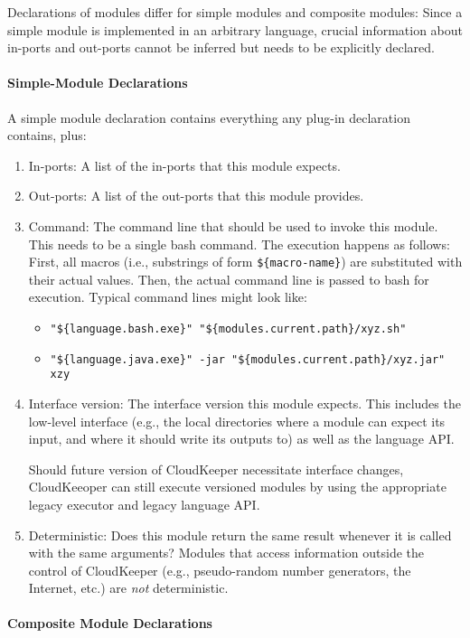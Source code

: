 Declarations of modules differ for simple modules and composite modules: Since a simple module is implemented in an arbitrary language, crucial information about in-ports and out-ports cannot be inferred but needs to be explicitly declared.

\paragraph{Simple-Module Declarations}

A simple module declaration contains everything any plug-in declaration contains, plus:
%
\begin{enumerate}
	\item In-ports: A list of the in-ports that this module expects.
	\item Out-ports: A list of the out-ports that this module provides.
	\item Command: The command line that should be used to invoke this module. This needs to be a single bash command. The execution happens as follows: First, all macros (i.e., substrings of form \texttt{\$\{macro-name\}}) are substituted with their actual values. Then, the actual command line is passed to bash for execution. Typical command lines might look like:
		\begin{itemize}
			\item \texttt{"\$\{language.bash.exe\}" "\$\{modules.current.path\}/xyz.sh"}
			\item \texttt{"\$\{language.java.exe\}" -jar "\$\{modules.current.path\}/xyz.jar" xzy}
		\end{itemize}
	\item Interface version: The interface version this module expects. This includes the low-level interface (e.g., the local directories where a module can expect its input, and where it should write its outputs to) as well as the language API.

		Should future version of CloudKeeper necessitate interface changes, CloudKeeoper can still execute versioned modules by using the appropriate legacy executor and legacy language API.
	\item Deterministic: Does this module return the same result whenever it is called with the same arguments? Modules that access information outside the control of CloudKeeper (e.g., pseudo-random number generators, the Internet, etc.) are \emph{not} deterministic.
\end{enumerate}

\paragraph{Composite Module Declarations}


